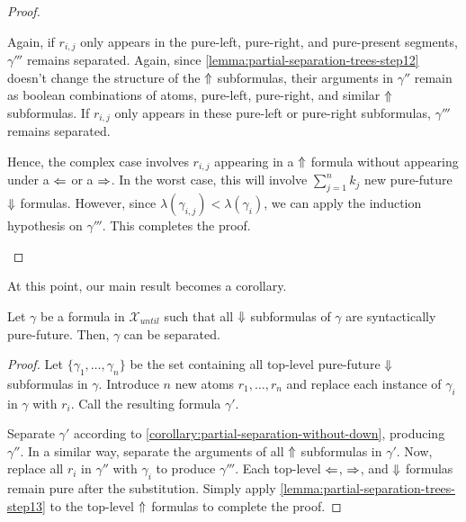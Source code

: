 \documentclass[a4paper,UKenglish,cleveref, autoref, thm-restate, numberwithinsect]{lipics-v2021}
\def\Larrow{\ensuremath\mathord{\Leftarrow}}
\def\Rarrow{\ensuremath\mathord{\Rightarrow}}
\def\Uarrow{\ensuremath\mathord{\Uparrow}}
\def\Darrow{\ensuremath\mathord{\Downarrow}}
\begin{document}
\begin{proof}
\begin{description}
        Again, if $r_{i, j}$ only appears in the pure-left, pure-right, and pure-present segments, $\gamma'''$ remains separated. Again, since \cref{lemma:partial-separation-trees-step12} doesn't change the structure of the $\Uarrow$ subformulas, their arguments in $\gamma''$ remain as boolean combinations of atoms, pure-left, pure-right, and similar $\Uarrow$ subformulas. If $r_{i, j}$ only appears in these pure-left or pure-right subformulas, $\gamma'''$ remains separated.

        Hence, the complex case involves $r_{i, j}$ appearing in a $\Uarrow$ formula without appearing under a $\Larrow$ or a $\Rarrow$. In the worst case, this will involve $\sum_{j=1}^{n} k_j$ new pure-future $\Darrow$ formulas. However, since $\lambda(\gamma_{i, j}) < \lambda(\gamma_i)$, we can apply the induction hypothesis on $\gamma'''$. This completes the proof.
    \end{description}
\end{proof}
At this point, our main result becomes a corollary.
\begin{corollary}
    \label{corollary:partial-separation-final}
    Let $\gamma$ be a formula in $\mathcal{X}_{until}$ such that all $\Darrow$ subformulas of $\gamma$ are syntactically pure-future. Then, $\gamma$ can be separated.
\end{corollary}
\begin{proof}
    Let $\{\gamma_1, \ldots, \gamma_n\}$ be the set containing all top-level pure-future $\Darrow$ subformulas in $\gamma$. Introduce $n$ new atoms $r_1, \ldots, r_n$ and replace each instance of $\gamma_i$ in $\gamma$ with $r_i$. Call the resulting formula $\gamma'$.

    Separate $\gamma'$ according to \cref{corollary:partial-separation-without-down}, producing $\gamma''$. In a similar way, separate the arguments of all $\Uarrow$ subformulas in $\gamma'$. Now, replace all $r_i$ in $\gamma''$ with $\gamma_i$ to produce $\gamma'''$. Each top-level $\Larrow$, $\Rarrow$, and $\Darrow$ formulas remain pure after the substitution. Simply apply \cref{lemma:partial-separation-trees-step13} to the top-level $\Uarrow$ formulas to complete the proof.
\end{proof}

%








\end{document}
